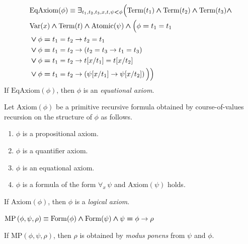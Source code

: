 \documentclass[10pt]{amsart}
\newcommand{\mexists}{\boldsymbol{\exists}}
\newcommand{\mand}{\boldsymbol{\wedge}}
\newcommand{\mor}{\boldsymbol{\vee}}
\newcommand{\mle}{\boldsymbol{<}}
\newcommand{\meq}{\boldsymbol{=}}
\begin{document}
\begin{definition}
	$$
		\begin{aligned}[t]
			 & \mathrm{EqAxiom}(\phi) \equiv \mexists_{t_{\rm{1}},t_{\rm{2}},t_{\rm{3}},x,t,\psi \mle \phi}\Bigl(\mathrm{Term}(t_{\rm{1}})\mand \mathrm{Term}(t_{\rm{2}}) \mand \mathrm{Term}(t_{\rm{3}}) \mand                        \\
			 & \mathrm{Var}(x) \mand \mathrm{Term}(t) \mand \mathrm{Atomic}(\psi) \mand \Bigl(                                                                                                         \phi \meq t_{\rm{1}}=t_{\rm{1}} \\
			 & \begin{aligned}[t]
				    & \mor \phi \meq t_{\rm{1}} = t_{\rm{2}} \ra t_{\rm{2}} = t_{\rm{1}}                                              \\
				    & \mor \phi \meq t_{\rm{1}} = t_{\rm{2}} \ra \left(t_{\rm{2}} = t_{\rm{3}} \ra t_{\rm{1}} = t_{\rm{3}}\right)     \\
				    & \mor \phi \meq t_{\rm{1}} = t_{\rm{2}} \ra t[x/t_{\rm{1}}] = t[x/t_{\rm{2}}]                                    \\
				    & \mor \phi \meq t_{\rm{1}} = t_{\rm{2}} \ra \left(\psi[x/t_{\rm{1}}] \ra \psi[x/t_{\rm{2}}]\right)\,\Bigr)\Bigr) \\
			   \end{aligned}
		\end{aligned}
	$$
	If $\mathrm{EqAxiom}(\phi)$, then $\phi$ is an \textit{equational axiom}.
\end{definition}

\begin{definition}
	Let $\mathrm{Axiom}(\phi)$ be a primitive recursive formula obtained by course-of-values recursion on the structure of $\phi$ as follows.
	\begin{enumerate}[label=\textbf{(\arabic*)}, leftmargin=3.0em]
		\item $\phi$ is a propositional axiom.
		\item $\phi$ is a quantifier axiom.
		\item $\phi$ is an equational axiom.
		\item $\phi$ is a formula of the form $\forall_x\,\psi$ and $\mathrm{Axiom}(\psi)$ holds.
	\end{enumerate}
	If $\mathrm{Axiom}(\phi)$, then $\phi$ is a \textit{logical axiom}.
\end{definition}

\begin{definition}
	$\mathrm{MP}\left(\phi,\psi,\rho\right) \equiv \mathrm{Form}(\phi) \mand \mathrm{Form}(\psi) \mand \psi \meq \phi \ra \rho$

	If $\mathrm{MP}\left(\phi,\psi,\rho\right)$, then $\rho$ is obtained by \textit{modus ponens} from $\psi$ and $\phi$.
\end{definition}
\end{document}
